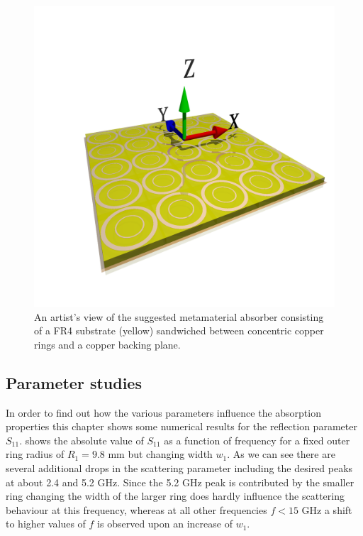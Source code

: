 \begin{figure}
\centering
\includegraphics[width=0.75\linewidth]{./media/double_rings.png}
\caption{An artist's view of the suggested metamaterial absorber consisting of a FR4 substrate (yellow) sandwiched between concentric copper rings and a copper backing plane.}
\label{fig:artist_view}
\end{figure}

\subsection{Parameter studies}
In order to find out how the various parameters influence the absorption properties this chapter shows some numerical results for the reflection parameter $S_{11}$.
 shows the absolute value of $S_{11}$ as a function of frequency for a fixed outer ring radius of $R_1=9.8$ mm but changing width $w_1$. As we can see there are several additional drops in the scattering parameter including the desired peaks at about 2.4 and 5.2 GHz. Since the 5.2 GHz peak is contributed by the smaller ring changing the width of the larger ring does hardly influence the scattering behaviour at this frequency, whereas at all other frequencies $f<15$ GHz a shift to higher values of $f$ is observed upon an increase of $w_1$.

